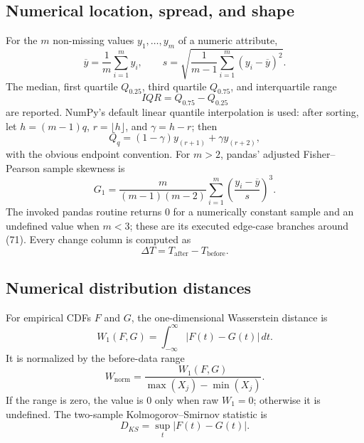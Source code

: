 \documentclass[11pt,a4paper]{article}
\begin{document}
\subsection{Numerical location, spread, and shape}

For the $m$ non-missing values $y_1,\ldots,y_m$ of a numeric attribute,
\begin{equation}
\overline y=\frac1m\sum_{i=1}^{m}y_i,
\qquad
s=\sqrt{\frac{1}{m-1}\sum_{i=1}^{m}(y_i-\overline y)^2}.
\tag{68}
\end{equation}
The median, first quartile $Q_{0.25}$, third quartile $Q_{0.75}$, and
interquartile range
\begin{equation}
IQR=Q_{0.75}-Q_{0.25}
\tag{69}
\end{equation}
are reported.  NumPy's default linear quantile interpolation is used: after
sorting, let $h=(m-1)q$, $r=\lfloor h\rfloor$, and $\gamma=h-r$; then
\begin{equation}
Q_q=(1-\gamma)y_{(r+1)}+\gamma y_{(r+2)},
\tag{70}
\end{equation}
with the obvious endpoint convention.  For $m>2$, pandas' adjusted Fisher--
Pearson sample skewness is
\begin{equation}
G_1=\frac{m}{(m-1)(m-2)}
\sum_{i=1}^{m}\left(\frac{y_i-\overline y}{s}\right)^3.
\tag{71}
\end{equation}
The invoked pandas routine returns $0$ for a numerically constant sample and an
undefined value when $m<3$; these are its executed edge-case branches around
(71).
Every change column is computed as
\begin{equation}
\Delta T=T_{\mathrm{after}}-T_{\mathrm{before}}.
\tag{72}
\end{equation}

\subsection{Numerical distribution distances}

For empirical CDFs $F$ and $G$, the one-dimensional Wasserstein distance is
\begin{equation}
W_1(F,G)=\int_{-\infty}^{\infty}|F(t)-G(t)|\,dt.
\tag{73}
\end{equation}
It is normalized by the before-data range
\begin{equation}
W_{\mathrm{norm}}=
\frac{W_1(F,G)}{\max(X_j)-\min(X_j)}.
\tag{74}
\end{equation}
If the range is zero, the value is $0$ only when raw $W_1=0$; otherwise it is
undefined.  The two-sample Kolmogorov--Smirnov statistic is
\begin{equation}
D_{KS}=\sup_t|F(t)-G(t)|.
\tag{75}
\end{equation}
\end{document}

